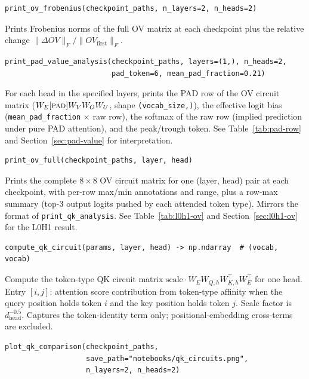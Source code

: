 \documentclass[11pt, a4paper]{article}
\begin{document}
\begin{lstlisting}
print_ov_frobenius(checkpoint_paths, n_layers=2, n_heads=2)
\end{lstlisting}

Prints Frobenius norms of the full OV matrix at each checkpoint plus the
relative change $\|\Delta OV\|_F / \|OV_{\text{first}}\|_F$.

\begin{lstlisting}
print_pad_value_analysis(checkpoint_paths, layers=(1,), n_heads=2,
                         pad_token=6, mean_pad_fraction=0.21)
\end{lstlisting}

For each head in the specified layers, prints the PAD row of the OV circuit
matrix ($W_E[\textsc{pad}] W_V W_O W_U$, shape \texttt{(vocab\_size,)}), the
effective logit bias (\texttt{mean\_pad\_fraction} $\times$ raw row), the
softmax of the raw row (implied prediction under pure PAD attention), and the
peak/trough token.  See Table~\ref{tab:pad-row} and
Section~\ref{sec:pad-value} for interpretation.

\begin{lstlisting}
print_ov_full(checkpoint_paths, layer, head)
\end{lstlisting}

Prints the complete $8 \times 8$ OV circuit matrix for one (layer, head) pair
at each checkpoint, with per-row max/min annotations and range, plus a
row-max summary (top-3 output logits pushed by each attended token type).
Mirrors the format of \texttt{print\_qk\_analysis}.  See
Table~\ref{tab:l0h1-ov} and Section~\ref{sec:l0h1-ov} for the L0H1 result.

\begin{lstlisting}
compute_qk_circuit(params, layer, head) -> np.ndarray  # (vocab, vocab)
\end{lstlisting}

Compute the token-type QK circuit matrix
$\text{scale} \cdot W_E W_{Q,h} W_{K,h}^\top W_E^\top$ for one head.
Entry $[i,j]$: attention score contribution from token-type affinity when
the query position holds token $i$ and the key position holds token $j$.
Scale factor is $d_{\text{head}}^{-0.5}$.  Captures the token-identity term
only; positional-embedding cross-terms are excluded.

\begin{lstlisting}
plot_qk_comparison(checkpoint_paths,
                   save_path="notebooks/qk_circuits.png",
                   n_layers=2, n_heads=2)
\end{lstlisting}
\end{document}
